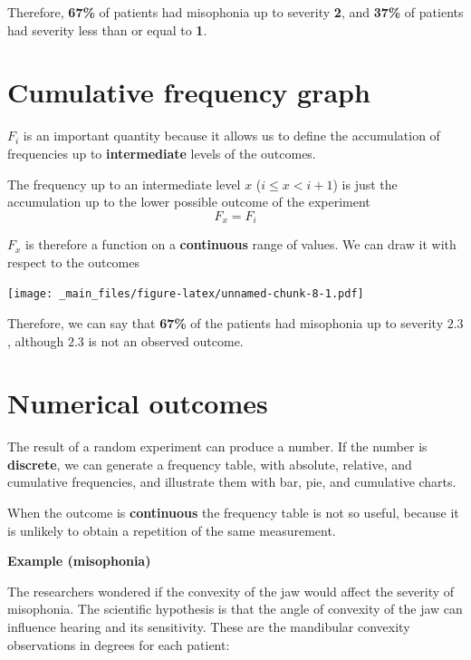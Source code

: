 \documentclass[
]{book}
\begin{document}
Therefore, \textbf{67\%} of patients had misophonia up to severity \textbf{2}, and \textbf{37\%} of patients had severity less than or equal to \textbf{1}.

\hypertarget{cumulative-frequency-graph}{%
\section{Cumulative frequency graph}\label{cumulative-frequency-graph}}

\(F_i\) is an important quantity because it allows us to define the accumulation of frequencies up to \textbf{intermediate} levels of the outcomes.

The frequency up to an intermediate level \(x\) (\(i\leq x< i+1\)) is just the accumulation up to the lower possible outcome of the experiment \[F_x = F_i\]

\(F_x\) is therefore a function on a \textbf{continuous} range of values. We can draw it with respect to the outcomes

\texttt{[image: \_main\_files/figure-latex/unnamed-chunk-8-1.pdf]}

Therefore, we can say that \textbf{67\%} of the patients had misophonia up to severity \(2.3\), although \(2.3\) is not an observed outcome.

\hypertarget{numerical-outcomes}{%
\section{Numerical outcomes}\label{numerical-outcomes}}

The result of a random experiment can produce a number. If the number is \textbf{discrete}, we can generate a frequency table, with absolute, relative, and cumulative frequencies, and illustrate them with bar, pie, and cumulative charts.

When the outcome is \textbf{continuous} the frequency table is not so useful, because it is unlikely to obtain a repetition of the same measurement.

\textbf{Example (misophonia)}

The researchers wondered if the convexity of the jaw would affect the severity of misophonia. The scientific hypothesis is that the angle of convexity of the jaw can influence hearing and its sensitivity. These are the mandibular convexity observations in degrees for each patient:
\end{document}
